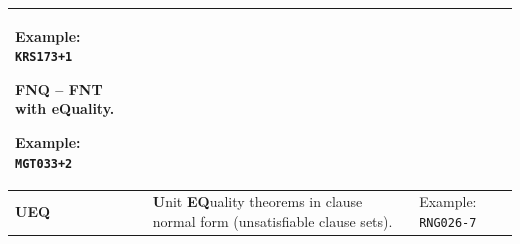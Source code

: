 \documentclass[aic]{iosart2x}
\begin{document}
\begin{table}[htbp]
\begin{tabular}{p{1cm}p{7cm}p{5cm}}
    Example: \texttt{KRS173+1}

\textbf{FNQ} -- \textbf{FN}T with e\textbf{Q}uality.

    Example: \texttt{MGT033+2} \\
\hline
% 
% 
%
\textbf{UEQ} &
     \textbf{U}nit \textbf{EQ}uality theorems in clause normal form
     (unsatisfiable clause sets). &
     Example: \texttt{RNG026-7} \\
\hline

\end{tabular}
\end{table}
\end{document}
